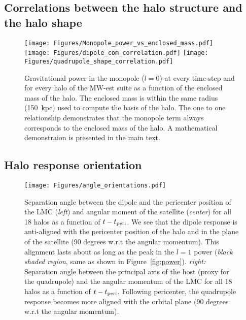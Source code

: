 \documentclass[twocolumn, linenumbers]{openjournal}
\begin{document}
\subsection{Correlations between the halo structure and the halo shape} \label{sec:correlations}

\begin{figure}[h]
    \texttt{[image: Figures/Monopole\_power\_vs\_enclosed\_mass.pdf]}
    \texttt{[image: Figures/dipole\_com\_correlation.pdf]}
    \texttt{[image: Figures/quadrupole\_shape\_correlation.pdf]}
\caption{Gravitational power in the monopole ($l=0$) at every time-step and for every halo
    of the MW-est suite as a function of the enclosed mass of the halo. The enclosed
    mass is within the same radius (150~kpc) used to compute the basis of the halo. The one
    to one relationship demonstrates that the monopole term always corresponds to the
    enclosed mass of the halo. A mathematical demonstraion is presented in the main text.}
\end{figure}




\subsection{Halo response orientation} \label{sec:orientation}



\begin{figure*}[h]
    \texttt{[image: Figures/angle\_orientations.pdf]}
    \caption[Orientation of Halo Response]{Separation angle between the dipole and the pericenter position of the 
    LMC (\emph{left}) and angular moment of the satellite (\emph{center}) for all 18 halos as a function of 
    $t-t_{\rm peri}$.  We see that the dipole response is anti-aligned with the pericenter position of the halo 
    and in the plane of the satellite (90 degrees w.r.t the angular momentum). This alignment lasts about as long 
    as the peak in the $l=1$ power (\emph{black shaded region}, same as shown in Figure~\ref{fig:power}). \emph{right:} 
    Separation angle between the principal axis of the host (proxy for the quadrupole) and the angular momentum of the 
    LMC for all 18 halos as a function of $t-t_{\rm peri}$. Following pericenter, the quadrupole response becomes 
    more aligned with the orbital plane (90 degrees w.r.t the angular momentum).} 
    \label{fig:orientation}
    \end{figure*}
    
\end{document}
